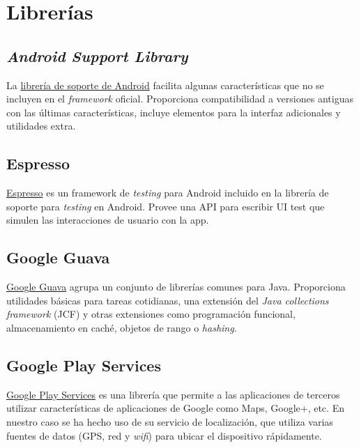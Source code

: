 \section{Librerías}\label{libreruxedas}

\subsection{\texorpdfstring{\emph{Android Support
Library}}{Android Support Library}}\label{android-support-library}

La
\href{https://developer.android.com/topic/libraries/support-library/}{librería
de soporte de Android} facilita algunas características que no se
incluyen en el \emph{framework} oficial. Proporciona compatibilidad a
versiones antiguas con las últimas características, incluye elementos
para la interfaz adicionales y utilidades extra.

\subsection{Espresso}\label{espresso}

\href{https://google.github.io/android-testing-support-library/docs/espresso/}{Espresso}
es un framework de \emph{testing} para Android incluido en la librería
de soporte para \emph{testing} en Android. Provee una API para escribir
UI test que simulen las interacciones de usuario con la app.

\subsection{Google Guava}\label{google-guava}

\href{https://github.com/google/guava}{Google Guava} agrupa un conjunto
de librerías comunes para Java. Proporciona utilidades básicas para
tareas cotidianas, una extensión del \emph{Java collections framework}
(JCF) y otras extensiones como programación funcional, almacenamiento en
caché, objetos de rango o \emph{hashing}.

\subsection{Google Play Services}\label{google-play-services}

\href{https://developers.google.com/android/guides/overview}{Google Play
Services} es una librería que permite a las aplicaciones de terceros
utilizar características de aplicaciones de Google como Maps, Google+,
etc. En nuestro caso se ha hecho uso de su servicio de localización, que
utiliza varias fuentes de datos (GPS, red y \emph{wifi}) para ubicar el
dispositivo rápidamente.

